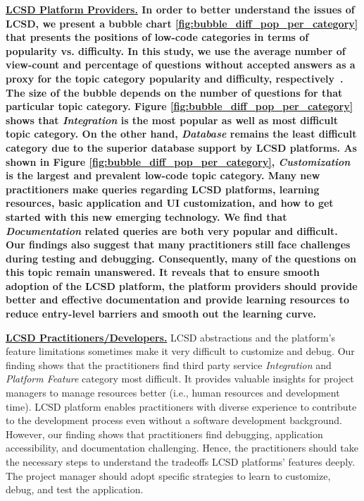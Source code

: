 \bf{\ul{ LCSD Platform Providers.}} 
In order to better understand the issues of LCSD, we present a bubble chart \ref{fig:bubble_diff_pop_per_category} that presents the positions
of low-code categories in terms of popularity vs. difficulty. In this study, we
use the average number of view-count and percentage of questions without accepted
answers as a proxy for the topic category popularity and difficulty,
respectively~\cite{abdellatif2020challenges}. The size of the bubble depends on
the number of questions for that particular topic category.
Figure \ref{fig:bubble_diff_pop_per_category} shows that \textit{Integration} is
the most popular as well as most difficult topic category. On the other hand,
\textit{Database} remains the least difficult category due to the superior database support by  LCSD platforms. As shown in Figure \ref{fig:bubble_diff_pop_per_category},
\textit{Customization} is the largest and prevalent low-code topic category.
Many new practitioners make queries regarding LCSD platforms,
learning resources, basic application and UI customization, and how to get
started with this new emerging technology. We find that \textit{Documentation}
related queries are both very popular and difficult. Our
findings also suggest that many practitioners still face challenges during testing and debugging. Consequently, many of
the questions on this topic remain unanswered. It reveals that to ensure smooth adoption of the LCSD platform, the platform providers should provide better and effective documentation and provide learning resources to reduce entry-level barriers and smooth out the learning curve. 

\textbf{\ul{ LCSD Practitioners/Developers.}} LCSD abstractions and the platform's
feature limitations sometimes make it very difficult to customize and debug. Our
finding shows that the practitioners find third party service \textit{Integration}
and \textit{Platform Feature} category most difficult. It provides valuable
insights for project managers to manage resources better (i.e., human resources and
development time). 
LCSD platform enables practitioners with diverse experience to contribute to the development process even without a software development
background. However, our finding shows that practitioners find debugging, application
accessibility, and documentation challenging. Hence, the practitioners should take
the necessary steps to understand the tradeoffs LCSD platforms' features deeply. The project manager should adopt specific strategies to learn to customize, debug, and test the application.


